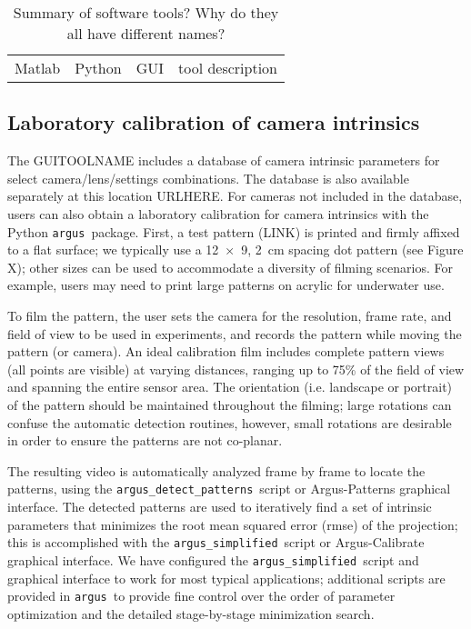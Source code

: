\documentclass[fleqn,10pt]{wlpeerj}
\newcommand{\argus}{\texttt{argus}}
\newcommand{\detectpatterns}{\texttt{argus\_detect\_patterns}}
\newcommand{\simplified}{\texttt{argus\_simplified}}
\begin{document}
\begin{table}
\caption{Summary of software tools?  Why do they all have different names?}
\label{table:softwarez}
\begin{center}
\begin{tabular}{cccc}
Matlab & Python & GUI & tool description \\
\end{tabular}
\end{center}
\end{table}



\subsection*{Laboratory calibration of camera intrinsics}
The GUITOOLNAME includes a database of camera intrinsic parameters for select camera/lens/settings combinations.  The database is also available separately at this location URLHERE. For cameras not included in the database, users can also obtain a laboratory calibration for camera intrinsics with the  Python \argus\ package. First, a test pattern (LINK) is printed and firmly affixed to a flat surface; we typically use a \num{12 x 9}, \SI{2}{\centi\meter} spacing dot pattern (see Figure X); other sizes can be used to accommodate a diversity of filming scenarios.  For example, users may need to print large patterns on acrylic for underwater use.

To film the pattern, the user sets the camera for the resolution, frame rate, and field of view to be used in experiments, and records the pattern while moving the pattern (or camera). An ideal calibration film includes complete pattern views (all points are visible) at varying distances, ranging up to 75\% of the field of view and spanning the entire sensor area. The orientation (i.e. landscape or portrait) of the pattern should be maintained throughout the filming; large rotations can confuse the automatic detection routines, however, small rotations are desirable in order to ensure the patterns are not co-planar.  

The resulting video is automatically analyzed frame by frame to locate the patterns, using the \detectpatterns\ script or Argus-Patterns graphical interface.  The detected patterns are used to iteratively find a set of intrinsic parameters that minimizes the root mean squared error (rmse) of the projection; this is accomplished with the \simplified\ script or Argus-Calibrate graphical interface.  We have configured the \simplified\ script and graphical interface to work for most typical applications; additional scripts are provided in \argus\ to provide fine control over the order of parameter optimization and the detailed stage-by-stage minimization search.
\end{document}
